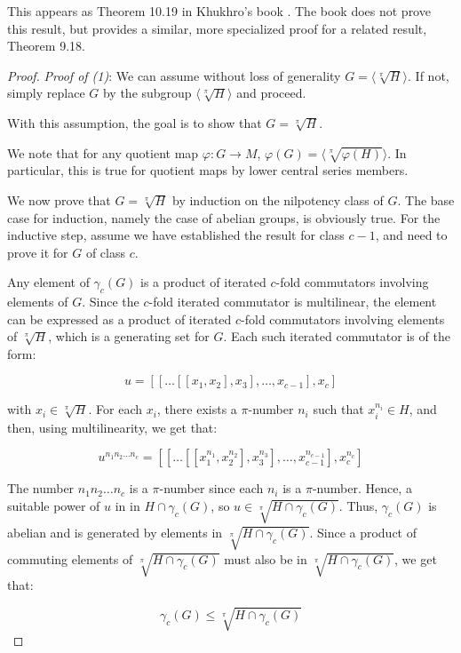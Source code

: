 This appears as Theorem 10.19 in Khukhro's book \cite{Khukhro}. The
book does not prove this result, but provides a similar, more
specialized proof for a related result, Theorem 9.18.

\begin{proof}
  {\em Proof of (1)}: We can assume without loss of generality $G = \langle
  \sqrt[\pi]{H} \rangle$. If not, simply replace $G$ by the subgroup
  $\langle \sqrt[\pi]{H} \rangle$ and proceed. 

  With this assumption, the goal is to show that $G = \sqrt[\pi]{H}$.

  We note that for any quotient map $\varphi:G \to M$, $\varphi(G) =
  \langle \sqrt[\pi]{\varphi(H)} \rangle$. In particular, this is true for
  quotient maps by lower central series members.

  We now prove that $G = \sqrt[\pi]{H}$ by induction on the nilpotency
  class of $G$. The base case for induction, namely the case of
  abelian groups, is obviously true. For the inductive step, assume we
  have established the result for class $c - 1$, and need to prove it
  for $G$ of class $c$.

  Any element of $\gamma_c(G)$ is a product of iterated $c$-fold
  commutators involving elements of $G$. Since the $c$-fold iterated
  commutator is multilinear, the element can be expressed as a product
  of iterated $c$-fold commutators involving elements of
  $\sqrt[\pi]{H}$, which is a generating set for $G$. Each such
  iterated commutator is of the form:

  $$u = [[\dots[[x_1,x_2],x_3],\dots,x_{c-1}],x_c]$$

  with $x_i \in \sqrt[\pi]{H}$. For each $x_i$, there exists a
  $\pi$-number $n_i$ such that $x_i^{n_i} \in H$, and then, using
  multilinearity, we get that:

  $$u^{n_1n_2 \dots n_c} = [[\dots[[x_1^{n_1},x_2^{n_2}],x_3^{n_3}],\dots,x_{c-1}^{n_{c-1}}],x_c^{n_c}]$$

  The number $n_1n_2 \dots n_c$ is a $\pi$-number since each $n_i$ is
  a $\pi$-number. Hence, a suitable power of $u$ in in $H \cap
  \gamma_c(G)$, so $u \in \sqrt[\pi]{H \cap \gamma_c(G)}$. Thus,
  $\gamma_c(G)$ is abelian and is generated by elements in
  $\sqrt[\pi]{H \cap \gamma_c(G)}$. Since a product of commuting
  elements of $\sqrt[\pi]{H \cap \gamma_c(G)}$ must also be in
  $\sqrt[\pi]{H \cap \gamma_c(G)}$, we get that:

  $$\gamma_c(G) \le \sqrt[\pi]{H \cap \gamma_c(G)}$$


\end{proof}
